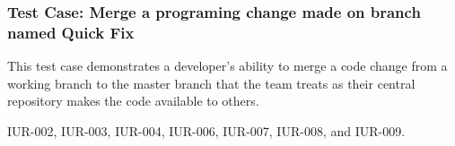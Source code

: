 \subsubsection{Test Case: Merge a programing change made on branch named Quick Fix}
\begin{description}[align=right,leftmargin=3.2cm,labelindent=3.0cm]
\item[Purpose:] This test case demonstrates a developer's ability to merge a code change from a working branch to the master branch that the team treats as their central repository makes the code available to others.
\item[Requirement:] IUR-002, IUR-003, IUR-004, IUR-006, IUR-007, IUR-008, and IUR-009.
\end{description}
